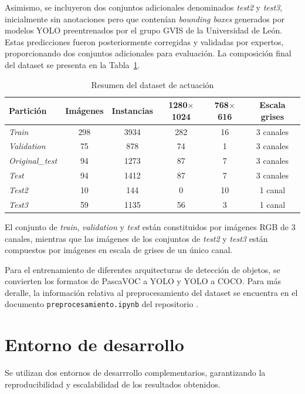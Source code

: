 \documentclass[12pt,a4paper,onecolumn,oneside]{report}
\begin{document}
Asimismo, se incluyeron dos conjuntos adicionales denominados \textit{test2} y \textit{test3}, inicialmente sin anotaciones pero que contenían \textit{bounding boxes} generados por modelos YOLO \cite{ultralytics_models} preentrenados 
por el grupo GVIS de la Universidad de León. Estas predicciones fueron posteriormente corregidas y validadas por expertos, proporcionando dos conjuntos adicionales para evaluación. 
La composición final del dataset se presenta en la Tabla~\ref{tab:dataset_final}.

\clearpage
\begin{table}[htbp]
\centering
{}
\begin{tabular}{l c c c c c}
\toprule
Partición & Imágenes & Instancias & 1280$\times$1024 & 768$\times$616 & Escala grises\\
\midrule
\textit{Train}          & 298 & 3934 & 282 & 16 & 3 canales\\
\textit{Validation}     &  75 &  878 & 74  & 1  & 3 canales\\
\textit{Original\_test} &  94 & 1273 & 87  & 7  & 3 canales\\
\textit{Test}           &  94 & 1412 & 87  & 7  & 3 canales\\
\textit{Test2}          &  10 &  144 & 0   & 10 & 1 canal\\
\textit{Test3}          &  59 & 1135 & 56  & 3  & 1 canal\\
\bottomrule
\end{tabular}
\caption{Resumen del dataset de actuación}
\label{tab:dataset_final}
\end{table}

El conjunto de \textit{train}, \textit{validation} y \textit{test} están constituidos por imágenes RGB de 3 canales, mientras que las imágenes 
de los conjuntos de \textit{test2} y \textit{test3} están compuestos por imágenes en escala de grises de un único canal. 

Para el entrenamiento de diferentes arquitecturas de detección de objetos, se convierten los formatos de PascaVOC a YOLO y YOLO a COCO. 
Para más deralle, la información relativa al preprocesamiento del dataset se encuentra en el documento \texttt{preprocesamiento.ipynb} del repositorio \cite{repoTFM}.

\section{Entorno de desarrollo}
\label{sec:Entorno de desarrollo}
Se utilizan dos entornos de desarrrollo complementarios, garantizando la reproducibilidad y escalabilidad de los resultados obtenidos.
\end{document}

